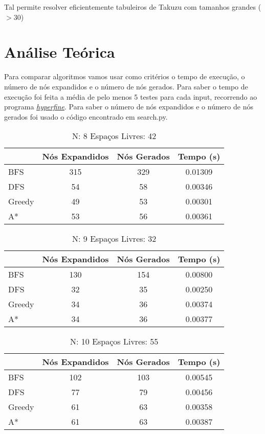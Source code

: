 \documentclass[12pt,a4paper]{article}
\begin{document}
  Tal permite resolver eficientemente tabuleiros de Takuzu com tamanhos grandes ($> 30$)
  

  \section{Análise Teórica}

  Para comparar algoritmos vamos usar como critérios o tempo de execução, o número de nós expandidos e o número de nós gerados.
  Para saber o tempo de execução foi feita a média de pelo menos 5 testes para cada input, recorrendo ao programa \href{https://github.com/sharkdp/hyperfine}{\textit{hyperfine}}.
  Para saber o número de nós expandidos e o número de nós gerados foi usado o código encontrado em search.py.

  \begin{table}[H]
    \caption{N: 8 Espaços Livres: 42}
    \label{tab:my-table}
    \centering
    \begin{tabular}{lccc}
      & Nós Expandidos & Nós Gerados & Tempo (s) \\
      \hline
      BFS    & 315 & 329 & 0.01309 \\
      DFS    &  54 &  58 & 0.00346 \\
      Greedy &  49 &  53 & 0.00301 \\
      A*     &  53 &  56 & 0.00361 \\
    \hline
    \end{tabular}
  \end{table}

  \begin{table}[H]
    \caption{N: 9 Espaços Livres: 32}
    \label{tab:my-table1}
    \centering
    \begin{tabular}{lccc}
      & Nós Expandidos & Nós Gerados & Tempo (s) \\
      \hline
      BFS     & 130 & 154 & 0.00800 \\
      DFS     &  32 &  35 & 0.00250 \\
      Greedy  &  34 &  36 & 0.00374 \\
      A*      &  34 &  36 & 0.00377 \\
    \hline
    \end{tabular}
  \end{table}

  \begin{table}[H]
    \caption{N: 10 Espaços Livres: 55}
    \label{tab:my-table2}
    \centering
    \begin{tabular}{lccc}
      & Nós Expandidos & Nós Gerados & Tempo (s) \\
      \hline
      BFS    & 102 & 103  & 0.00545 \\
      DFS    &  77 &  79  & 0.00456 \\
      Greedy &  61 &  63  & 0.00358 \\
      A*     &  61 &  63  & 0.00387 \\
    \hline
    \end{tabular}
  \end{table}
\end{document}
